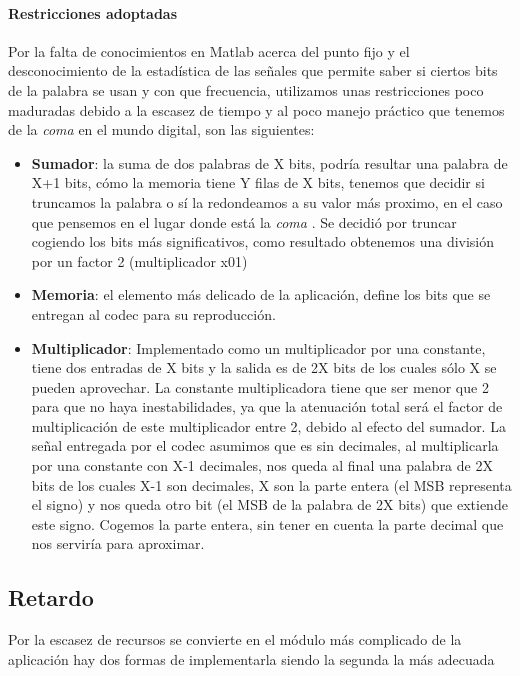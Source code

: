 \paragraph{Restricciones adoptadas} 
	Por la falta de conocimientos en Matlab acerca del punto fijo y el desconocimiento de la estadística de las señales que permite saber si ciertos bits de la palabra se usan y con que frecuencia, utilizamos unas restricciones poco maduradas debido a la escasez de tiempo y al poco manejo práctico que tenemos de la \emph{coma} en el mundo digital, son las siguientes:
\begin{itemize}
\item \textbf{Sumador}: la suma de dos palabras de X bits, podría resultar una palabra de X+1 bits, cómo la memoria tiene Y filas de X bits, tenemos que decidir si truncamos la palabra o sí la redondeamos a su valor más proximo, en el caso que pensemos en el lugar donde está la \emph{coma} . 
	Se decidió por truncar cogiendo los bits más significativos, como resultado obtenemos una división por un factor 2 (multiplicador x01)  
\item \textbf{Memoria}: el elemento más delicado de la aplicación, define los bits que se entregan al codec para su reproducción.
\item \textbf{Multiplicador}: Implementado como un multiplicador por una constante, tiene dos entradas de X bits y la salida es de 2X bits de los cuales sólo X se pueden aprovechar.  La constante multiplicadora tiene que ser menor que 2 para que no haya inestabilidades, ya que la atenuación total será el factor de multiplicación de este multiplicador entre 2, debido al efecto del sumador. 
	La señal entregada por el codec asumimos que es sin decimales, al multiplicarla por una constante con X-1 decimales, nos queda al final una palabra de 2X bits de los cuales X-1 son decimales, X son la parte entera (el MSB representa el signo) y nos queda otro bit (el MSB de la palabra de 2X bits) que extiende este signo.
	Cogemos la parte entera, sin tener en cuenta la parte decimal que nos serviría para aproximar.
\end{itemize}
 
	\subsection{Retardo}
	Por la escasez de recursos se convierte en el módulo más complicado de la aplicación hay dos formas de implementarla siendo la segunda la más adecuada  
